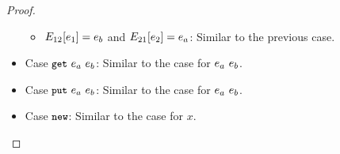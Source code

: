 \begin{proof}
\begin{itemize}
\begin{itemize}
        \item $E_{12}\hspace{-0.5mm}\left[e_1\right] = e_b$ and
          $E_{21}\hspace{-0.5mm}\left[e_2\right] = e_a$: Similar to the previous
          case.
      \end{itemize}

    \item Case $\mbox{\small{\texttt{get}}}~e_a~e_b$: Similar to the case for $e_a~e_b$.

    \item Case $\mbox{\small{\texttt{put}}}~e_a~e_b$: Similar to the case for $e_a~e_b$.

    \item Case $\mbox{\small{\texttt{new}}}$: Similar to the case for $x$.
  \end{itemize}
\end{proof}
